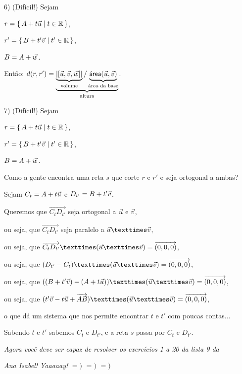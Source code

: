 \documentclass[oneside]{book}
\begin{document}
6) (Difícil!) Sejam

$r  = \{\,A+t {\vec u}\;|\;t \in\mathbb{R}\,\}$,

$r' = \{\,B+t'{\vec v}\;|\;t'\in\mathbb{R}\,\}$,

$B = A+{\vec w}$.

\def\ut#1#2{\underbrace{#1}_{\text{#2}}}

Então: $d(r,r') = \ut{\ut{|[\uu,\vv,\ww]|}{volume} / \ut{\area(\uu,\vv)}{área da base}}{altura}$.

7) (Difícil!) Sejam

$r  = \{\,A+t {\vec u}\;|\;t \in\mathbb{R}\,\}$,

$r' = \{\,B+t'{\vec v}\;|\;t'\in\mathbb{R}\,\}$,

$B = A+{\vec w}$.

Como a gente encontra uma reta $s$ que corte $r$ e $r'$ e seja ortogonal a ambas?

Sejam $C_t = A+t {\vec u}$ e $D_{t'} = B+t' {\vec v}$.

Queremos que $\Vec{C_tD_{t'}}$ seja ortogonal a ${\vec u}$ e ${\vec v}$,

ou seja, que $\Vec{C_tD_{t'}}$ seja paralelo a $\uu×\vv$,

ou seja, que $\Vec{C_tD_{t'}}×(\uu×\vv)=\V(0,0,0)$,

ou seja, que $(D_{t'}-C_t)×(\uu×\vv)=\V(0,0,0)$,

ou seja, que $((B+t'\vv)-(A+t \uu))×(\uu×\vv)=\V(0,0,0)$,

ou seja, que $(t'\vv - t\uu + \Vec{AB})×(\uu×\vv)=\V(0,0,0)$,

o que dá um sistema que nos permite encontrar $t$ e $t'$ com poucas contas...

Sabendo $t$ e $t'$ sabemos $C_t$ e $D_{t'}$, e a reta $s$ passa por $C_t$ e $D_{t'}$.

\bsk

{\sl Agora você deve ser capaz de resolver os exercícios 1 a 20 da lista 9 da}

{\sl Ana Isabel! Yaaaaay!} $=)$ $=)$ $=)$




\newpage


%                             

\mypsectionstex

\end{document}

